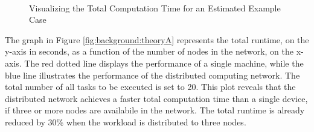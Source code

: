\begin{figure}[bth]
  \myfloatalign
   \\
   \caption{Visualizing the Total Computation Time for an Estimated Example Case}
   \label{fig:background:theoryplot}
\end{figure}

The graph in Figure \ref{fig:background:theoryA} represents the total runtime, on the y-axis in seconds, as a function of the number of nodes in the network, on the x-axis. The red dotted line displays the performance of a single machine, while the blue line illustrates the performance of the distributed computing network. The total number of all tasks to be executed is set to 20. This plot reveals that the distributed network achieves a faster total computation time than a single device, if three or more nodes are availabile in the network. The total runtime is already reduced by 30\% when the workload is distributed to three nodes.

